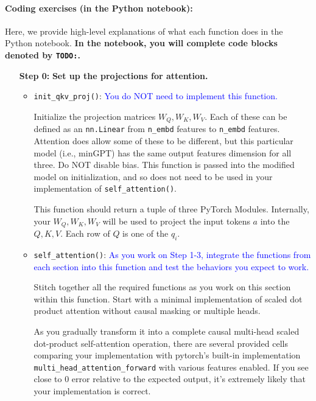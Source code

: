 \documentclass{article}
\begin{document}
\paragraph{Coding exercises (in the Python notebook):}

    Here, we provide high-level explanations of what each function does in the
    Python notebook. \textbf{In the notebook, you will complete code blocks
    denoted by \texttt{TODO:}.}

    \begin{enumerate}
        \item[\textbf{Step 0:}]
        \textbf{Set up the projections for attention.}

        
        \begin{itemize}
        \item \verb|init_qkv_proj()|: \textcolor{blue}{You do NOT need to
        implement this function.}
        
        Initialize the projection matrices $W_Q, W_K, W_V$. Each of these can be
        defined as an \verb|nn.Linear| from \verb|n_embd| features to
        \verb|n_embd| features. Attention does allow some of these to be
        different, but this particular model (i.e., minGPT) has the same output
        features dimension for all three. Do NOT disable bias. This function is
        passed into the modified model on initialization, and so does not need
        to be used in your implementation of \verb|self_attention()|.

        This function should return a tuple of three PyTorch Modules.
        Internally, your $W_Q, W_K, W_V$ will be used to project the input
        tokens $a$ into the  $Q, K, V$. Each row of $Q$ is one of the $q_i$.
        
        \item  \verb|self_attention()|: \textcolor{blue}{As you work on Step
        1-3, integrate the functions from each section into this function and
        test the behaviors you expect to work.}
        
        Stitch together all the required functions as you work on this section
        within this function. Start with a minimal implementation of scaled dot
        product attention without causal masking or multiple heads. 
        
        As you gradually transform it into a complete causal multi-head scaled
        dot-product self-attention operation, there are several provided cells
        comparing your implementation with pytorch's built-in implementation
        \verb|multi_head_attention_forward| with various features enabled. If
        you see close to 0 error relative to the expected output, it's extremely
        likely that your implementation is correct.
        

\end{itemize}
\end{enumerate}
\end{document}
